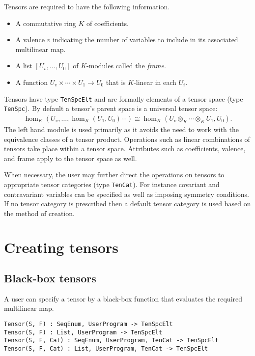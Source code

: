 
Tensors are required to have the following information.
\begin{itemize}
\item A commutative ring $K$ of coefficients.
\item A valence $v$ indicating the number of variables to include in its 
associated multilinear map.
\item A list $[U_v,\dots, U_0]$ of $K$-modules called the {\em frame}.
\item A function $U_v\times \cdots \times U_1\to U_0$ that is $K$-linear in 
each $U_i$.
\end{itemize}
Tensors have type {\tt TenSpcElt} and are formally elements of a tensor space 
(type {\tt TenSpc}).  By default a tensor's parent space is a universal tensor space:
\begin{align*}
	\hom_K(U_v,\dots,\hom_K(U_1,U_0)\cdots) \cong \hom_K(U_v\otimes_K\cdots \otimes_K U_1,U_0).
\end{align*}
The left hand module is used primarily as it avoids the need to work with 
the equivalence classes of a tensor product.
Operations such as linear combinations of tensors take place within a  
tensor space.
Attributes such as coefficients, valence, and frame  apply to the tensor space 
as well.

When necessary, the user may further direct the operations on tensors to 
appropriate tensor categories 
(type {\tt TenCat}).  For instance covariant and contravariant variables can 
be specified
as well as imposing symmetry conditions.  If no tensor category is prescribed
then a default tensor category is used based on the method of creation.
\medskip

\minitoc


\section{Creating tensors}

\subsection{Black-box tensors}
A user can specify a tensor by a black-box function that 
evaluates the required
multilinear map.

\color{blue}
{\small \begin{verbatim}
Tensor(S, F) : SeqEnum, UserProgram -> TenSpcElt
Tensor(S, F) : List, UserProgram -> TenSpcElt
Tensor(S, F, Cat) : SeqEnum, UserProgram, TenCat -> TenSpcElt
Tensor(S, F, Cat) : List, UserProgram, TenCat -> TenSpcElt
\end{verbatim} }
\color{black}

